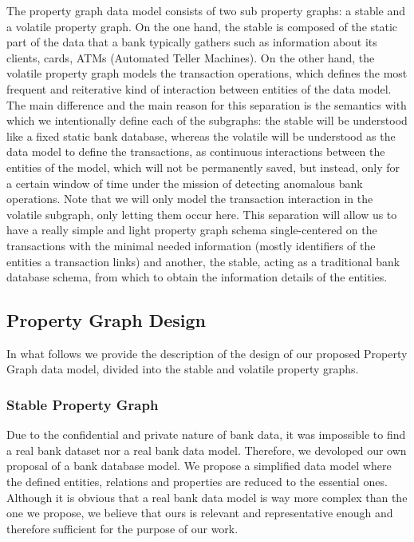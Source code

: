 \documentclass{article}
\begin{document}
The property graph data model consists of two sub property graphs: a stable and a volatile property graph. On the one hand, the stable is composed of the static part of the data that a bank typically gathers such as information about its clients, cards, ATMs (Automated Teller Machines). 
On the other hand, the volatile property graph models the transaction operations, which defines the most frequent and reiterative kind of interaction between entities of the data model.\\
The main difference and the main reason for this separation is the semantics with which we intentionally define each of the subgraphs: the stable will be understood like a fixed static bank database, whereas the volatile will be understood as the data model to define the transactions, as continuous interactions between the entities of the model, which will not be permanently saved, but instead, only for a certain window of time under the mission of detecting anomalous bank operations. Note that we will only model the transaction interaction in the volatile subgraph, only letting them occur here.
This separation will allow us to have a really simple and light property graph schema single-centered on the transactions with the minimal needed information (mostly identifiers of the entities a transaction links) and another, the stable, acting as a traditional bank database schema, from which to obtain the information details of the entities.

\subsection{Property Graph Design}

In what follows we provide the description of the design of our proposed
Property Graph data model, divided into the stable and volatile property
graphs.

\subsubsection{Stable Property Graph}

Due to the confidential and private nature of bank data, it was
impossible to find a real bank dataset nor a real bank data model. Therefore, we devoloped our own proposal of a bank database model.
We propose a simplified data model where the defined entities, relations and properties are reduced to the essential ones.
Although it is obvious that a real bank data model is way more complex than the one we propose, we believe that ours is relevant and representative enough and therefore sufficient for the purpose of our work. 
\end{document}
